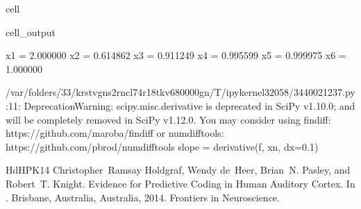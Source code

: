 \documentclass[letterpaper,10pt,english]{jupyterBook}
\begin{document}
\begin{sphinxuseclass}{cell}
\begin{sphinxVerbatimOutput}
\begin{sphinxuseclass}{cell_output}
\begin{sphinxVerbatim}[commandchars=\\\{\}]
x\PYGZus{}1 = 2.000000
x\PYGZus{}2 = 0.614862
x\PYGZus{}3 = 0.911249
x\PYGZus{}4 = 0.995599
x\PYGZus{}5 = 0.999975
x\PYGZus{}6 = 1.000000
\end{sphinxVerbatim}

\begin{sphinxVerbatim}[commandchars=\\\{\}]
/var/folders/33/krstvgns2rncl74r18tkv6\PYGZus{}80000gn/T/ipykernel\PYGZus{}32058/3440021237.py:11: DeprecationWarning: scipy.misc.derivative is deprecated in SciPy v1.10.0; and will be completely removed in SciPy v1.12.0. You may consider using findiff: https://github.com/maroba/findiff or numdifftools: https://github.com/pbrod/numdifftools
  slope = derivative(f, x\PYGZus{}n, dx=0.1)
\end{sphinxVerbatim}

\end{sphinxuseclass}\end{sphinxVerbatimOutput}

\end{sphinxuseclass}
\begin{sphinxthebibliography}{HdHPK14}
\sphinxAtStartPar
Christopher Ramsay Holdgraf, Wendy de Heer, Brian N. Pasley, and Robert T. Knight. Evidence for Predictive Coding in Human Auditory Cortex. In . Brisbane, Australia, Australia, 2014. Frontiers in Neuroscience.
\end{sphinxthebibliography}







\renewcommand{\indexname}{Index}
\printindex
\end{document}
